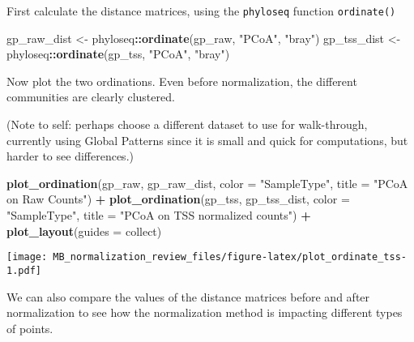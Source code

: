 \documentclass[
]{book}
\newenvironment{Shaded}{\begin{snugshade}}{\end{snugshade}}
\newcommand{\DataTypeTok}[1]{\textcolor[rgb]{0.13,0.29,0.53}{#1}}
\newcommand{\KeywordTok}[1]{\textcolor[rgb]{0.13,0.29,0.53}{\textbf{#1}}}
\newcommand{\NormalTok}[1]{#1}
\newcommand{\OperatorTok}[1]{\textcolor[rgb]{0.81,0.36,0.00}{\textbf{#1}}}
\newcommand{\StringTok}[1]{\textcolor[rgb]{0.31,0.60,0.02}{#1}}
\begin{document}
First calculate the distance matrices, using the \texttt{phyloseq} function \texttt{ordinate()}

\begin{Shaded}
\begin{Highlighting}[]
\NormalTok{gp\_raw\_dist \textless{}{-}}\StringTok{ }\NormalTok{phyloseq}\OperatorTok{::}\KeywordTok{ordinate}\NormalTok{(gp\_raw, }\StringTok{"PCoA"}\NormalTok{, }\StringTok{"bray"}\NormalTok{)}
\NormalTok{gp\_tss\_dist \textless{}{-}}\StringTok{ }\NormalTok{phyloseq}\OperatorTok{::}\KeywordTok{ordinate}\NormalTok{(gp\_tss, }\StringTok{"PCoA"}\NormalTok{, }\StringTok{"bray"}\NormalTok{)}
\end{Highlighting}
\end{Shaded}

Now plot the two ordinations. Even before normalization, the different communities are clearly clustered.

(Note to self: perhaps choose a different dataset to use for walk-through, currently using Global Patterns since it is small and quick for computations, but harder to see differences.)

\begin{Shaded}
\begin{Highlighting}[]
\KeywordTok{plot\_ordination}\NormalTok{(gp\_raw, gp\_raw\_dist, }\DataTypeTok{color =} \StringTok{"SampleType"}\NormalTok{, }
                \DataTypeTok{title =} \StringTok{"PCoA on Raw Counts"}\NormalTok{) }\OperatorTok{+}\StringTok{ }
\KeywordTok{plot\_ordination}\NormalTok{(gp\_tss, gp\_tss\_dist, }\DataTypeTok{color =} \StringTok{"SampleType"}\NormalTok{, }
                \DataTypeTok{title =} \StringTok{"PCoA on TSS normalized counts"}\NormalTok{) }\OperatorTok{+}
\StringTok{  }\KeywordTok{plot\_layout}\NormalTok{(}\DataTypeTok{guides =} \StringTok{\textquotesingle{}collect\textquotesingle{}}\NormalTok{)}
\end{Highlighting}
\end{Shaded}

\texttt{[image: MB\_normalization\_review\_files/figure-latex/plot\_ordinate\_tss-1.pdf]}

We can also compare the values of the distance matrices before and after normalization to see how the normalization method is impacting different types of points.
\end{document}
